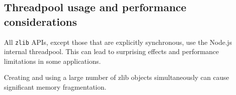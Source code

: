 \begin{Shaded}
\begin{Highlighting}[]
  \KeywordTok{=\textgreater{}} \NormalTok{()))}
  \KeywordTok{=\textgreater{}}\NormalTok{ \{}
    \NormalTok{(}\OperatorTok{,}\OperatorTok{;}
     \OperatorTok{=} \OperatorTok{;}
\NormalTok{  \})}\OperatorTok{;}
\end{Highlighting}
\end{Shaded}

\subsection{Threadpool usage and performance
considerations}\label{threadpool-usage-and-performance-considerations}

All \texttt{zlib} APIs, except those that are explicitly synchronous,
use the Node.js internal threadpool. This can lead to surprising effects
and performance limitations in some applications.

Creating and using a large number of zlib objects simultaneously can
cause significant memory fragmentation.

\begin{Shaded}
\begin{Highlighting}[]
\OperatorTok{=} \NormalTok{(}\NormalTok{)}\OperatorTok{;}

\OperatorTok{=} \NormalTok{(}\NormalTok{)}\OperatorTok{;}

\CommentTok{// }
\NormalTok{ (}\OperatorTok{=} \OperatorTok{;}\OperatorTok{\textless{}} \OperatorTok{;} \OperatorTok{++}
\OperatorTok{,}\OperatorTok{,}\KeywordTok{=\textgreater{}}\NormalTok{ \{\})}\OperatorTok{;}
\NormalTok{\}}
\end{Highlighting}
\end{Shaded}

